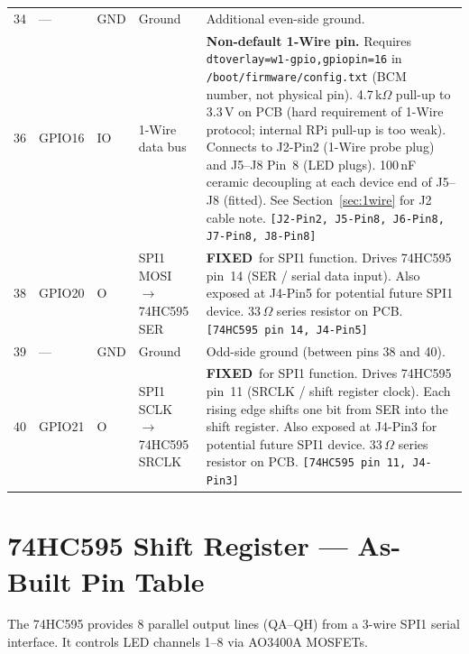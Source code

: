\documentclass[11pt,a4paper]{article}
\newcommand{\fixed}{\textbf{FIXED}}
\newcommand{\na}{---}
\newcommand{\jref}[1]{\texttt{\small[#1]}}
\begin{document}
\begin{longtable}{C{0.85cm} C{1.2cm} C{0.65cm} L{3.2cm} L{8.1cm}}
  34 & \na & GND & Ground &
    Additional even-side ground. \\

  36 & GPIO16 & IO & 1-Wire data bus &
    \textbf{Non-default 1-Wire pin.}
    Requires \texttt{dtoverlay=w1-gpio,gpiopin=16} in
    \texttt{/boot/firmware/config.txt} (BCM number, not physical pin).
    4.7\,k$\Omega$ pull-up to 3.3\,V on PCB (hard requirement of 1-Wire protocol;
    internal RPi pull-up is too weak).
    Connects to J2-Pin2 (1-Wire probe plug) and J5--J8 Pin~8 (LED plugs).
    100\,nF ceramic decoupling at each device end of J5--J8 (fitted).
    See Section~\ref{sec:1wire} for J2 cable note.
    \jref{J2-Pin2, J5-Pin8, J6-Pin8, J7-Pin8, J8-Pin8} \\

  38 & GPIO20 & O & SPI1 MOSI $\to$ 74HC595 SER &
    \fixed\ for SPI1 function. Drives 74HC595 pin~14 (SER / serial data input).
    Also exposed at J4-Pin5 for potential future SPI1 device.
    33\,$\Omega$ series resistor on PCB.
    \jref{74HC595 pin~14, J4-Pin5} \\

  39 & \na & GND & Ground &
    Odd-side ground (between pins 38 and 40). \\

  40 & GPIO21 & O & SPI1 SCLK $\to$ 74HC595 SRCLK &
    \fixed\ for SPI1 function. Drives 74HC595 pin~11 (SRCLK / shift register clock).
    Each rising edge shifts one bit from SER into the shift register.
    Also exposed at J4-Pin3 for potential future SPI1 device.
    33\,$\Omega$ series resistor on PCB.
    \jref{74HC595 pin~11, J4-Pin3} \\

\end{longtable}

\section{74HC595 Shift Register --- As-Built Pin Table}
\label{sec:595}

The 74HC595 provides 8 parallel output lines (QA--QH) from a 3-wire
SPI1 serial interface.  It controls LED channels 1--8 via AO3400A MOSFETs.

\vspace{4pt}
\setlength{\tabcolsep}{4pt}
\renewcommand{\arraystretch}{1.3}
\end{document}
